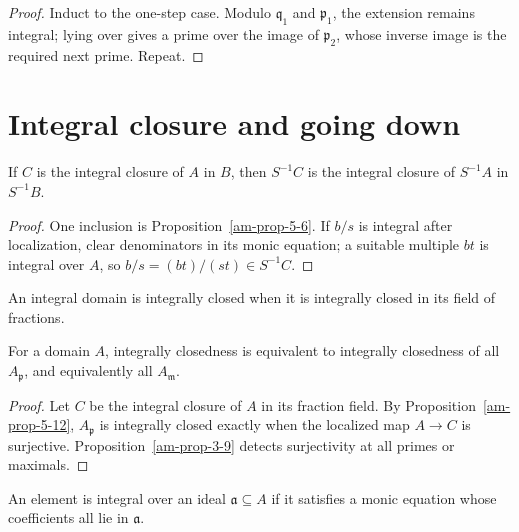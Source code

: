 \begin{proof}
Induct to the one-step case.  Modulo $\mathfrak{q}_1$ and $\mathfrak{p}_1$, the extension remains
integral; lying over gives a prime over the image of $\mathfrak{p}_2$, whose inverse image
is the required next prime.  Repeat.
\end{proof}

\section{Integral closure and going down}
\label{am-ch5-going-down}
\begin{proposition}
\label{am-prop-5-12}
\uses{}
If $C$ is the integral closure of $A$ in $B$, then $S^{-1}C$ is the integral
closure of $S^{-1}A$ in $S^{-1}B$.
\end{proposition}
\begin{proof}
One inclusion is Proposition~\ref{am-prop-5-6}.  If $b/s$ is integral after
localization, clear denominators in its monic equation; a suitable multiple
$bt$ is integral over $A$, so $b/s=(bt)/(st)\in S^{-1}C$.
\end{proof}
\begin{definition}
\label{am-def-integrally-closed}
\uses{}
An integral domain is integrally closed when it is integrally closed in its field
of fractions.
\end{definition}
\begin{proposition}
\label{am-prop-5-13}
\uses{}
For a domain $A$, integrally closedness is equivalent to integrally closedness of
all $A_\mathfrak{p}$, and equivalently all $A_\mathfrak{m}$.
\end{proposition}
\begin{proof}
Let $C$ be the integral closure of $A$ in its fraction field.  By
Proposition~\ref{am-prop-5-12}, $A_\mathfrak{p}$ is integrally closed exactly when the
localized map $A\to C$ is surjective.  Proposition~\ref{am-prop-3-9} detects
surjectivity at all primes or maximals.
\end{proof}
\begin{definition}
\label{am-def-integral-ideal}
\uses{}
An element is integral over an ideal $\mathfrak{a}\subseteq A$ if it satisfies a
monic equation whose coefficients all lie in $\mathfrak{a}$.
\end{definition}
